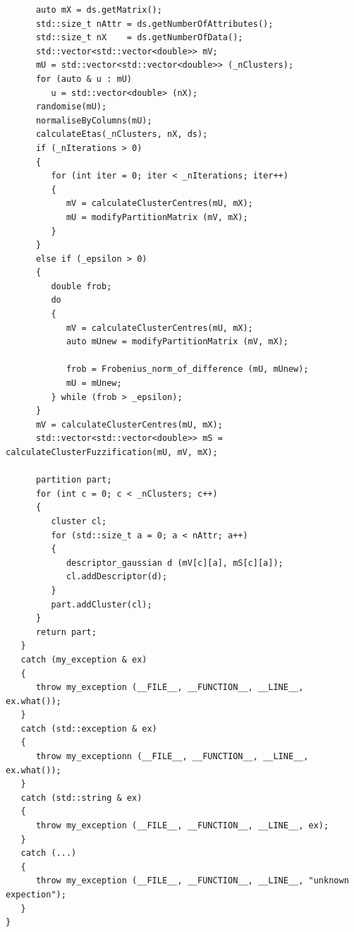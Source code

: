 \documentclass[a4paper,twoside,12pt]{book}
\begin{document}
\begin{appendices}
\begin{lstlisting}
      auto mX = ds.getMatrix();
      std::size_t nAttr = ds.getNumberOfAttributes();
      std::size_t nX    = ds.getNumberOfData();
      std::vector<std::vector<double>> mV;
      mU = std::vector<std::vector<double>> (_nClusters);
      for (auto & u : mU)
         u = std::vector<double> (nX);
      randomise(mU);
      normaliseByColumns(mU);
      calculateEtas(_nClusters, nX, ds);
      if (_nIterations > 0)
      {
         for (int iter = 0; iter < _nIterations; iter++)
         {
            mV = calculateClusterCentres(mU, mX);
            mU = modifyPartitionMatrix (mV, mX);
         }
      }
      else if (_epsilon > 0)
      {
         double frob;
         do 
         {
            mV = calculateClusterCentres(mU, mX);
            auto mUnew = modifyPartitionMatrix (mV, mX);
            
            frob = Frobenius_norm_of_difference (mU, mUnew);
            mU = mUnew;
         } while (frob > _epsilon);
      }
      mV = calculateClusterCentres(mU, mX);
      std::vector<std::vector<double>> mS = calculateClusterFuzzification(mU, mV, mX);
      
      partition part;
      for (int c = 0; c < _nClusters; c++)
      {
         cluster cl; 
         for (std::size_t a = 0; a < nAttr; a++)
         {
            descriptor_gaussian d (mV[c][a], mS[c][a]);
            cl.addDescriptor(d);
         }
         part.addCluster(cl);
      }
      return part;
   }
   catch (my_exception & ex)                                  
   {                                                       
      throw my_exception (__FILE__, __FUNCTION__, __LINE__, ex.what()); 
   }                                                          
   catch (std::exception & ex)                                 
   {                                                            
      throw my_exceptionn (__FILE__, __FUNCTION__, __LINE__, ex.what()); 
   }                                                            
   catch (std::string & ex)                                     
   {                                                            
      throw my_exception (__FILE__, __FUNCTION__, __LINE__, ex);        
   }                                                             
   catch (...)                                                   
   {                                                             
      throw my_exception (__FILE__, __FUNCTION__, __LINE__, "unknown expection");       
   }  
}
\end{lstlisting} 


\end{appendices}
\end{document}
